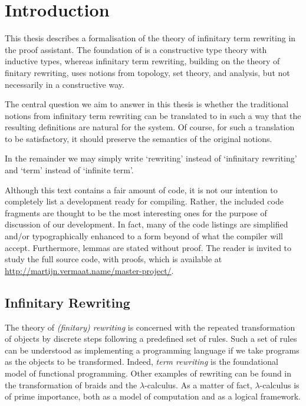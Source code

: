 \chapter{Introduction}
\setcounter{page}{1}

This thesis describes a formalisation of the theory of infinitary term
rewriting in the \Coq proof assistant. The foundation of \Coq is a
constructive type theory with inductive types, whereas infinitary term
rewriting, building on the theory of finitary rewriting, uses notions
from topology, set theory, and analysis, but not necessarily in a
constructive way.

The central question we aim to answer in this thesis is whether the
traditional notions from infinitary term rewriting can be translated
to \Coq in such a way that the resulting definitions are natural for
the \Coq system. Of course, for such a translation to be satisfactory,
it should preserve the semantics of the original notions.


In the remainder we may simply write `rewriting' instead of
`infinitary rewriting' and `term' instead of `infinite
term'.

Although this text contains a fair amount of \Coq code, it is not our
intention to completely list a development ready for compiling. Rather, the
included code fragments are thought to be the most interesting ones for the
purpose of discussion of our development. In fact, many of the code listings
are simplified and/or typographically enhanced to a form beyond of what the
\Coq compiler will accept. Furthermore, lemmas are stated without proof. The
reader is invited to study the full source code, with proofs, which is
available at \url{http://martijn.vermaat.name/master-project/}.


\section*{Infinitary Rewriting}

The theory of \emph{(finitary) rewriting} is concerned with the
repeated transformation of objects by discrete steps following a
predefined set of rules. Such a set of rules can be understood as
implementing a programming language if we take programs as the objects
to be transformed. Indeed, \emph{term rewriting} is the foundational
model of functional programming. Other examples of rewriting can be
found in the transformation of braids \citep{mellies-95} and the
$\lambda$-calculus. As a matter of fact, $\lambda$-calculus is of
prime importance, both as a model of computation and as a logical
framework.

